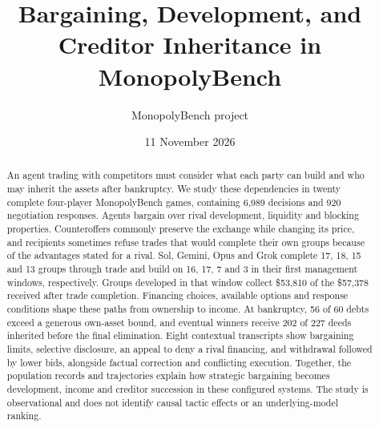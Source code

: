 \documentclass[11pt,letterpaper]{article}
\title{Bargaining, Development, and Creditor Inheritance in MonopolyBench}
\author{MonopolyBench project}
\date{11 November 2026}
\begin{document}



\maketitle
\begin{abstract}
An agent trading with competitors must consider what each party can build and who may inherit the assets after bankruptcy. We study these dependencies in twenty complete four-player MonopolyBench games, containing 6,989 decisions and 920 negotiation responses. Agents bargain over rival development, liquidity and blocking properties. Counteroffers commonly preserve the exchange while changing its price, and recipients sometimes refuse trades that would complete their own groups because of the advantages stated for a rival. Sol, Gemini, Opus and Grok complete 17, 18, 15 and 13 groups through trade and build on 16, 17, 7 and 3 in their first management windows, respectively. Groups developed in that window collect \$53,810 of the \$57,378 received after trade completion. Financing choices, available options and response conditions shape these paths from ownership to income. At bankruptcy, 56 of 60 debts exceed a generous own-asset bound, and eventual winners receive 202 of 227 deeds inherited before the final elimination. Eight contextual transcripts show bargaining limits, selective disclosure, an appeal to deny a rival financing, and withdrawal followed by lower bids, alongside factual correction and conflicting execution. Together, the population records and trajectories explain how strategic bargaining becomes development, income and creditor succession in these configured systems. The study is observational and does not identify causal tactic effects or an underlying-model ranking.
\end{abstract}








\begingroup\small

\endgroup
\clearpage\appendix

\end{document}
